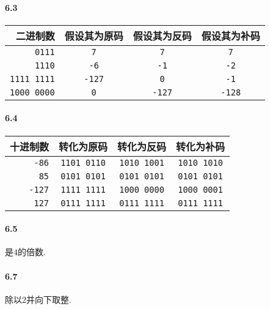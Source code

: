 \documentclass[UTF8]{ctexart}
\begin{document}
 

\pagestyle{main}
\linespread{1}
\paragraph{6.3}
\begin{center}
    \begin{tabular}{rccc}
        \toprule
        二进制数&假设其为原码&假设其为反码&假设其为补码\\
        \midrule
        \texttt{0111}&\texttt{7}&\texttt{7}&\texttt{7}\\
        \texttt{1110}&\texttt{-6}&\texttt{-1}&\texttt{-2}\\
        \texttt{1111 1111}&\texttt{-127}&\texttt{0}&\texttt{-1}\\
        \texttt{1000 0000}&\texttt{0}&\texttt{-127}&\texttt{-128}\\
        \bottomrule
    \end{tabular}
\end{center}
\paragraph{6.4}
\begin{center}
    \begin{tabular}{rccc}
        \toprule
        十进制数&转化为原码&转化为反码&转化为补码\\
        \midrule
        \texttt{-86}&\texttt{1101 0110}&\texttt{1010 1001}&\texttt{1010 1010}\\
        \texttt{85}&\texttt{0101 0101}&\texttt{0101 0101}&\texttt{0101 0101}\\
        \texttt{-127}&\texttt{1111 1111}&\texttt{1000 0000}&\texttt{1000 0001}\\
        \texttt{127}&\texttt{0111 1111}&\texttt{0111 1111}&\texttt{0111 1111}\\
        \bottomrule
    \end{tabular}
\end{center}
\paragraph{6.5}
是$4$的倍数.
\paragraph{6.7}
除以$2$并向下取整.
\end{document}
